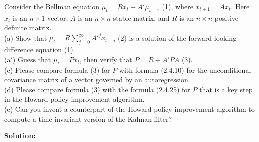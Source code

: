 \documentclass[12pt, letterpaper]{article}
\begin{document}
\begin{tcolorbox}[oddbox,title={Exercise 2.29 \quad Pure Prediction}]
\begin{tcolorbox}[questionbox]
Consider the Bellman equation $\mu_t=Rx_t+A'\mu_{t+1}$ (1), where $x_{t+1}=Ax_t$. Here $x_t$ is an
$n\times1$ vector, $A$ is an $n\times n$ stable matrix, and $R$ is an $n\times n$ positive definite
matrix.\\[3pt]
(a) Show that $\mu_t=R\sum_{j=0}^\infty A'^jx_{t+j}$ (2) is a solution of the forward-looking
difference equation (1).\\
(a$'$) Guess that $\mu_t=Px_t$, then verify that $P=R+A'PA$ (3).\\
(c) Please compare formula (3) for $P$ with formula (2.4.10) for the unconditional covariance matrix
of a vector governed by an autoregression.\\
(d) Please compare formula (3) with the formula (2.4.25) for $P$ that is a key step in the Howard
policy improvement algorithm.\\
(e) Can you invent a counterpart of the Howard policy improvement algorithm to compute a
time-invariant version of the Kalman filter?
\end{tcolorbox}

\textbf{Solution:}


\end{tcolorbox}
\end{document}
